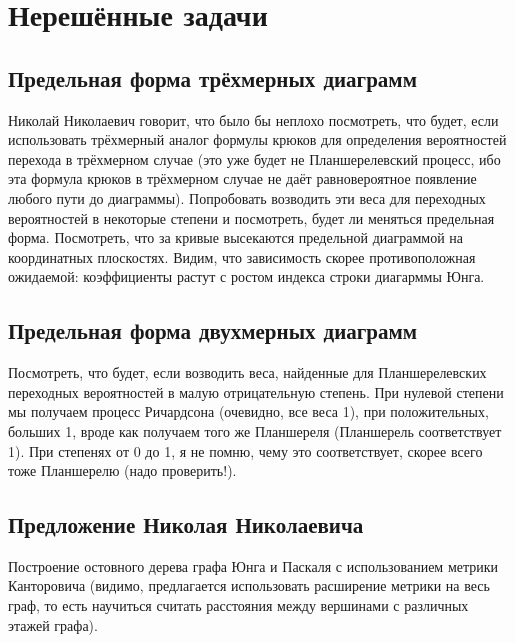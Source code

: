 \documentclass[12pt]{report}
\begin{document}
\newpage
\section* {Нерешённые задачи}

\subsection*{Предельная форма трёхмерных диаграмм}
\hspace{\parindent} Николай Николаевич говорит, что было бы неплохо посмотреть, что будет, если использовать трёхмерный аналог формулы крюков для определения вероятностей перехода в трёхмерном случае (это уже будет не Планшерелевский процесс, ибо эта формула крюков в трёхмерном случае не даёт равновероятное появление любого пути до диаграммы). Попробовать возводить эти веса для переходных вероятностей в некоторые степени и посмотреть, будет ли меняться предельная форма. Посмотреть, что за кривые высекаются предельной диаграммой на координатных плоскостях. Видим, что зависимость скорее противоположная ожидаемой: коэффициенты растут с ростом индекса строки диагарммы Юнга.

\subsection*{Предельная форма двухмерных диаграмм}

\hspace{\parindent} Посмотреть, что будет, если возводить веса, найденные для Планшерелевских переходных вероятностей в малую отрицательную степень. При нулевой степени мы получаем процесс Ричардсона (очевидно, все веса 1), при положительных, больших 1, вроде как получаем того же Планшереля (Планшерель соответствует 1). При степенях от 0 до 1, я не помню, чему это соответствует, скорее всего тоже Планшерелю (надо проверить!).

\subsection*{Предложение Николая Николаевича}

Построение остовного дерева графа Юнга и Паскаля с использованием метрики Канторовича (видимо, предлагается использовать расширение метрики на весь граф, то есть научиться считать расстояния между вершинами с различных этажей графа).
\end{document}
